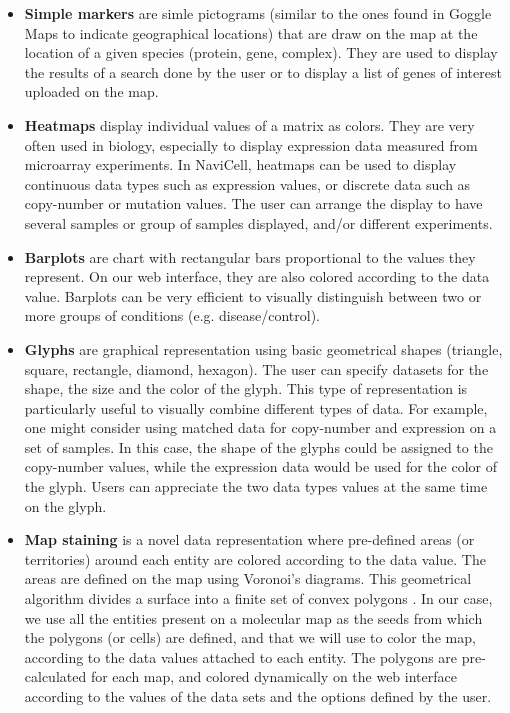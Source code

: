 \documentclass[a4,center,fleqn]{NAR}
\begin{document}
\begin{itemize}

\item \textbf{Simple markers} are simle pictograms (similar to the ones found in Goggle Maps
to indicate geographical locations) that are draw on the map at the location
of a given species (protein, gene, complex). They are used to display the
results of a search done by the user or to display a list of genes of interest
uploaded on the map.

\item \textbf{Heatmaps} display individual values of a matrix as
colors. They are very often used in biology, especially to display expression
data measured from microarray experiments. In NaviCell, heatmaps can be used to
display continuous data types such as expression values, or discrete data such
as copy-number or mutation values. The user can arrange the display to have
several samples or group of samples displayed, and/or different experiments. 

\item \textbf{Barplots} are chart with rectangular bars proportional to the values
they represent. On our web interface, they are also colored according to the
data value. Barplots can be very efficient to visually distinguish between two
or more groups of conditions (e.g. disease/control).  

\item \textbf{Glyphs} are graphical representation using basic geometrical shapes
(triangle, square, rectangle, diamond, hexagon). The user can specify datasets
for the shape, the size and the color of the glyph. This type of representation
is particularly useful to visually combine different types of data. For
example, one might consider using matched data for copy-number and expression
on a set of samples. In this case, the shape of the glyphs could be assigned to
the copy-number values, while the expression data would be used for the color of
the glyph. Users can appreciate the two data types values at the same time on
the glyph.

\item \textbf{Map staining} is a novel data representation where pre-defined areas
(or territories) around each entity are colored according to the data value. The
areas are defined on the map using Voronoi's diagrams. This geometrical
algorithm divides a surface into a finite set of convex polygons
\cite{aurenhammer1991voronoi}. In our case, we use all the entities present on a
molecular map as the seeds from which the polygons (or cells) are defined, and
that we will use to color the map, according to the data values attached to each
entity. The polygons are pre-calculated for each map, and colored dynamically on
the web interface according to the values of the data sets and the options
defined by the user.
\end{itemize}
\end{document}
